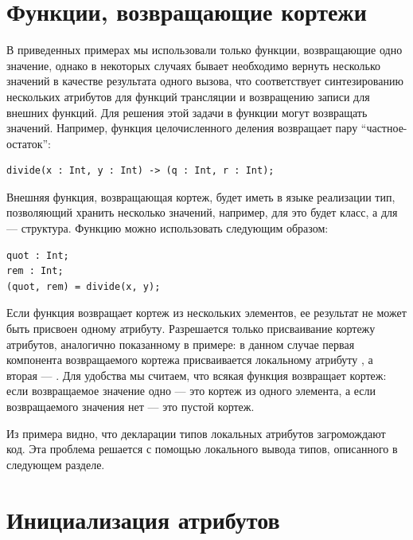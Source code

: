 \section{Функции, возвращающие кортежи}

В приведенных примерах мы использовали только функции, возвращающие одно значение, однако в некоторых случаях бывает необходимо вернуть несколько значений в качестве результата одного вызова, что соответствует синтезированию нескольких атрибутов для функций трансляции и возвращению записи для внешних функций. Для решения этой задачи в \ATF{} функции могут возвращать  значений. Например, функция целочисленного деления возвращает пару ``частное-остаток'':
\begin{lstlisting}[language=Grammatic]
divide(x : Int, y : Int) -> (q : Int, r : Int);
\end{lstlisting}
Внешняя функция, возвращающая кортеж, будет иметь в языке реализации тип, позволяющий хранить несколько значений, например, для  это будет класс, а для  --- структура. Функцию  можно использовать следующим образом:
\begin{lstlisting}[language=Grammatic]
quot : Int;
rem : Int;
(quot, rem) = divide(x, y);
\end{lstlisting}
Если функция возвращает кортеж из нескольких элементов, ее результат не может быть присвоен одному атрибуту. Разрешается только присваивание кортежу атрибутов, аналогично показанному в примере: в данном случае первая компонента возвращаемого кортежа присваивается локальному атрибуту , а вторая --- . Для удобства мы считаем, что всякая функция возвращает кортеж: если возвращаемое значение одно --- это кортеж из одного элемента, а если возвращаемого значения нет --- это пустой кортеж.

Из примера видно, что декларации типов локальных атрибутов загромождают код. Эта проблема решается с помощью локального вывода типов, описанного в следующем разделе.

\section{Инициализация атрибутов}

